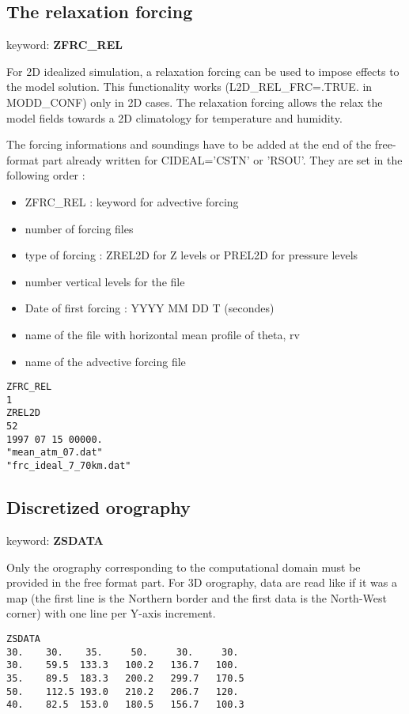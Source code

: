 \subsection{The relaxation forcing} \label{ss:rel_forcing}

keyword: {\bf ZFRC\_REL} 

For 2D idealized simulation, a relaxation forcing can be used to impose effects to the model solution. This functionality works (L2D\_REL\_FRC=.TRUE. in MODD\_CONF) only in 2D cases.  The relaxation forcing allows the relax the model fields towards a 2D climatology for temperature and humidity.
         
The forcing informations and soundings have to be added at the end of the
free-format part already written for CIDEAL='CSTN' or 'RSOU'. They are set in the following order : 
\begin{itemize}
\item ZFRC\_REL : keyword for advective forcing
\item number of forcing files
\item type of forcing : ZREL2D for Z levels or PREL2D for  pressure levels
\item number vertical levels for the file
\item Date of first forcing : YYYY MM DD T (secondes)
\item name of the file with horizontal mean profile of theta, rv
\item name of the advective forcing file
\end{itemize}

                                   
\begin{verbatim}
ZFRC_REL
1
ZREL2D
52
1997 07 15 00000.
"mean_atm_07.dat"
"frc_ideal_7_70km.dat"
\end{verbatim}

\subsection{Discretized orography}

keyword: {\bf ZSDATA}

Only the orography corresponding to the computational domain must be
provided in the free format part. For 3D orography, data are read like if it
was a map (the first line is the Northern border and the first data
is the North-West corner) with one line per Y-axis increment.

\begin{verbatim}
ZSDATA
30.    30.    35.     50.     30.     30.
30.    59.5  133.3   100.2   136.7   100.
35.    89.5  183.3   200.2   299.7   170.5
50.    112.5 193.0   210.2   206.7   120.
40.    82.5  153.0   180.5   156.7   100.3
\end{verbatim}


